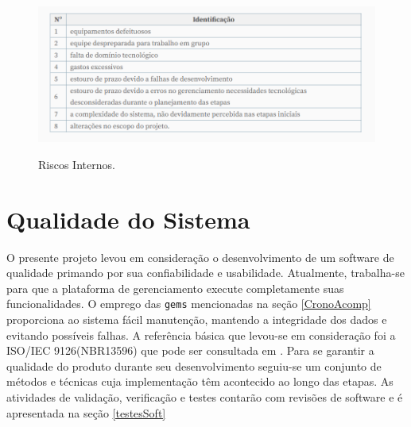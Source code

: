 \begin{figure}[h]
	\caption{Riscos Internos.}
	
	\centering %
	\includegraphics[scale=0.72]{Figs/riscos2.png} %
	\label{figura:riscos2}
\end{figure}


\section{Qualidade do Sistema}

 O presente projeto levou em consideração o desenvolvimento de um software de qualidade primando por sua confiabilidade e usabilidade. Atualmente, trabalha-se para que a plataforma de gerenciamento execute completamente suas funcionalidades. O emprego das \texttt{gems} mencionadas na seção \ref{CronoAcomp} proporciona ao sistema fácil manutenção, mantendo a integridade dos dados e evitando possíveis falhas. A referência básica que levou-se em consideração foi a ISO/IEC 9126(NBR13596) que pode ser consultada em \cite{qualidadeSoftware2008}. Para se garantir a qualidade do produto durante seu desenvolvimento seguiu-se um conjunto de métodos e técnicas cuja implementação têm acontecido ao longo das etapas. As atividades de validação, verificação e testes contarão com revisões de software e é apresentada na seção 
\ref{testesSoft} %
